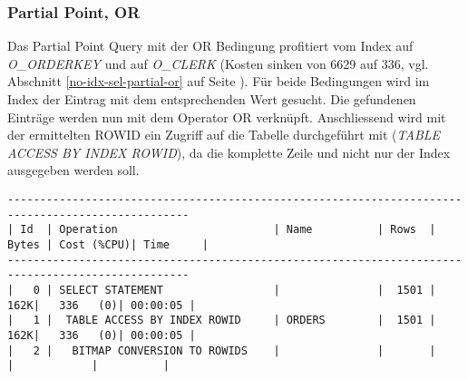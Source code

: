 \documentclass[11pt,a4paper,parskip=half]{scrartcl}
\begin{document}
\subsubsection{Partial Point, OR}
Das Partial Point Query mit der OR Bedingung profitiert vom Index auf \emph{O\_ORDERKEY} und auf \emph{O\_CLERK} (Kosten sinken von 6629 auf 336, vgl. Abschnitt \ref{no-idx-sel-partial-or} auf Seite \pageref{no-idx-sel-partial-or}). Für beide Bedingungen wird im Index der Eintrag mit dem entsprechenden Wert gesucht. Die gefundenen Einträge werden nun mit dem Operator OR verknüpft. Anschliessend wird mit der ermittelten ROWID ein Zugriff auf die Tabelle durchgeführt mit (\emph{TABLE ACCESS BY INDEX ROWID}), da die komplette Zeile und nicht nur der Index ausgegeben werden soll.
\begin{lstlisting}
--------------------------------------------------------------------------------------------------                                                                                                                                                                                                           
| Id  | Operation                        | Name          | Rows  | Bytes | Cost (%CPU)| Time     |                                                                                                                                                                                                           
--------------------------------------------------------------------------------------------------                                                                                                                                                                                                           
|   0 | SELECT STATEMENT                 |               |  1501 |   162K|   336   (0)| 00:00:05 |                                                                                                                                                                                                           
|   1 |  TABLE ACCESS BY INDEX ROWID     | ORDERS        |  1501 |   162K|   336   (0)| 00:00:05 |                                                                                                                                                                                                           
|   2 |   BITMAP CONVERSION TO ROWIDS    |               |       |       |            |          |                                                                                                                                                                                                           

\end{lstlisting}
\end{document}
